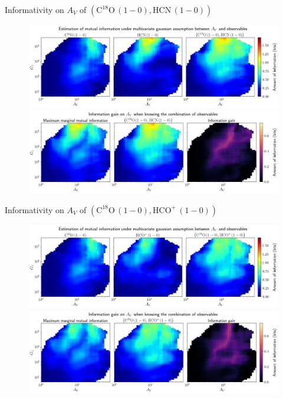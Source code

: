 \documentclass{beamer}
\begin{document}
\begin{frame}{Informativity on $A_V$ of $\left(\mathrm{C^{18}O\,(1-0)},\mathrm{HCN\,(1-0)}\right)$}
    \begin{figure}
        \centering
        \includegraphics[width=0.95\linewidth]{../linearinfogauss/av__c18o10_hcn10_linearinfogauss.png}
        \vfill
        \includegraphics[width=0.95\linewidth]{../linearinfogauss/av__c18o10_hcn10_linearinfogauss_gain.png}
    \end{figure}
\end{frame}

\begin{frame}{Informativity on $A_V$ of $\left(\mathrm{C^{18}O\,(1-0)},\mathrm{HCO^+\,(1-0)}\right)$}
    \begin{figure}
        \centering
        \includegraphics[width=0.95\linewidth]{../linearinfogauss/av__c18o10_hcop10_linearinfogauss.png}
        \vfill
        \includegraphics[width=0.95\linewidth]{../linearinfogauss/av__c18o10_hcop10_linearinfogauss_gain.png}
    \end{figure}
\end{frame}
\end{document}

